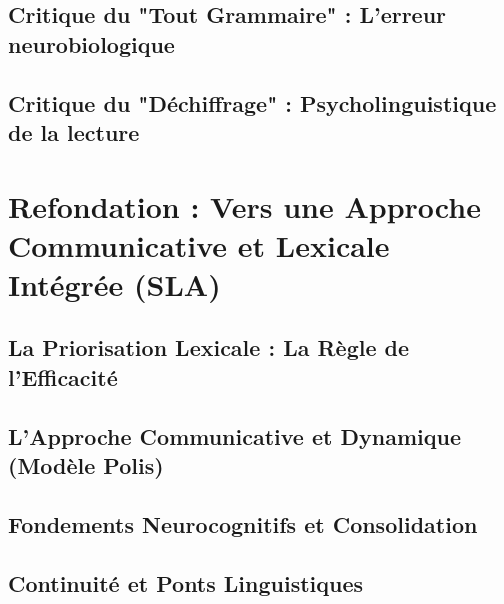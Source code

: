 \documentclass[a4paper,12pt,twoside]{report}
\begin{document}
\chapter{Critique du "Tout Grammaire" : L'erreur neurobiologique}




\chapter{Critique du "Déchiffrage" : Psycholinguistique de la lecture}




\part{Refondation : Vers une Approche Communicative et Lexicale Intégrée (SLA)}

\chapter{La Priorisation Lexicale : La Règle de l'Efficacité}




\chapter{L'Approche Communicative et Dynamique (Modèle Polis)}




\chapter{Fondements Neurocognitifs et Consolidation}




\chapter{Continuité et Ponts Linguistiques}



\newpage


\end{document}
